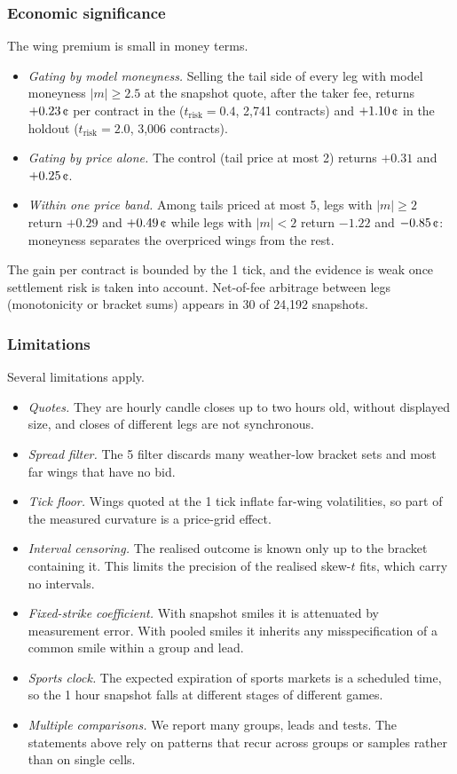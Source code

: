 \subsubsection{Economic significance}

The wing premium is small in money terms.
\begin{itemize}
\item \emph{Gating by model moneyness.} Selling the tail side of every leg with model moneyness
  $|m|\ge2.5$ at the snapshot quote, after the taker fee, returns $+0.23\cents$ per contract in the
  \estim{} ($t_{\text{risk}}=0.4$, 2,741 contracts) and $+1.10\cents$ in the holdout
  ($t_{\text{risk}}=2.0$, 3,006 contracts).
\item \emph{Gating by price alone.} The control (tail price at most 2\cents) returns $+0.31$ and
  $+0.25\cents$.
\item \emph{Within one price band.} Among tails priced at most 5\cents, legs with $|m|\ge2$ return
  $+0.29$ and $+0.49\cents$ while legs with $|m|<2$ return $-1.22$ and $-0.85\cents$: moneyness
  separates the overpriced wings from the rest.
\end{itemize}
The gain per contract is bounded by the 1\cents{} tick, and the evidence is weak once
settlement risk is taken into account. Net-of-fee arbitrage between legs (monotonicity or bracket
sums) appears in 30 of 24,192 snapshots. %

\subsubsection{Limitations}

Several limitations apply.
\begin{itemize}
\item \emph{Quotes.} They are hourly candle closes up to two hours old, without displayed size, and
  closes of different legs are not synchronous.
\item \emph{Spread filter.} The 5\cents{} filter discards many weather-low bracket sets and most
  far wings that have no bid.
\item \emph{Tick floor.} Wings quoted at the 1\cents{} tick inflate far-wing volatilities, so part of
  the measured curvature is a price-grid effect.
\item \emph{Interval censoring.} The realised outcome is known only up to the bracket containing
  it. This limits the precision of the realised skew-$t$ fits, which carry no intervals.
\item \emph{Fixed-strike coefficient.} With snapshot smiles it is attenuated by measurement error.
  With pooled smiles it inherits any misspecification of a common smile within a group and lead.
\item \emph{Sports clock.} The expected expiration of sports markets is a scheduled time, so the
  1 hour snapshot falls at different stages of different games.
\item \emph{Multiple comparisons.} We report many groups, leads and tests. The statements above
  rely on patterns that recur across groups or samples rather than on single cells.
\end{itemize}
